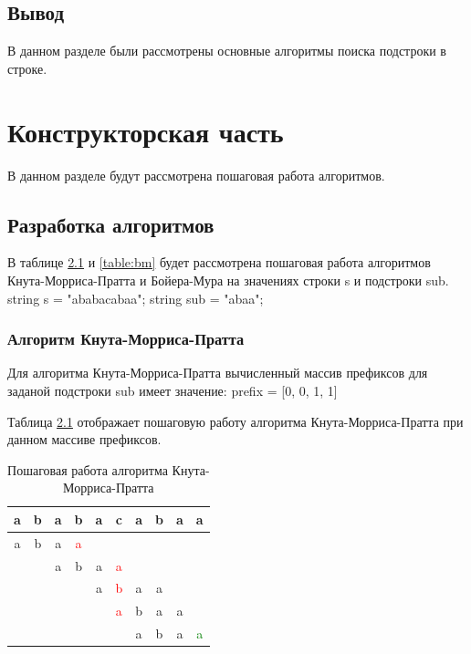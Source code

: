 \documentclass[a4paper,12pt]{report}
\begin{document}
	\section{Вывод}

		В данном разделе были рассмотрены основные алгоритмы поиска подстроки в строке.
	
    \newpage

    \chapter{Конструкторская часть}
        \label{sec:construct_part}
        
			В данном разделе будут рассмотрена пошаговая работа алгоритмов.

	\section{Разработка алгоритмов}
		
		В таблице \ref{table:kmp} и \ref{table:bm} будет рассмотрена пошаговая работа алгоритмов Кнута-Морриса-Пратта и Бойера-Мура на значениях строки s и подстроки sub.  
		\vspace{0.5cm}
		\newline
		string s = "ababacabaa"; 
		\newline 
		string sub = "abaa";  
		
	 \subsection{Алгоритм Кнута-Морриса-Пратта}
 
 		Для алгоритма Кнута-Морриса-Пратта вычисленный массив префиксов для заданой  подстроки sub имеет значение:
 		prefix = [0, 0, 1, 1]
 		
 		Таблица \ref{table:kmp} отображает пошаговую работу алгоритма Кнута-Морриса-Пратта при данном массиве префиксов.
 			
 			\begin{longtable}{| c | c | c | c | c | c | c | c | c | c | }
				\caption{Пошаговая работа алгоритма Кнута-Морриса-Пратта}
				\label{table:kmp}\\
 				\hline
 				a&b&a&b&a&c&a&b&a&a \\
 				\hline
 				\hline
 				a&b&a&\textcolor{red}{a}&&&&&&\\
 				\hline
 				&&a&b&a&\textcolor{red}{a}&&&&\\
 				\hline
 				&&&&a&\textcolor{red}{b}&a&a&&\\
 				\hline
 				&&&&&\textcolor{red}{a}&b&a&a&\\
 				\hline
 				&&&&&&a&b&a&\textcolor{green}{a}\\
 				\hline
 			\end{longtable}
	
\end{document}
